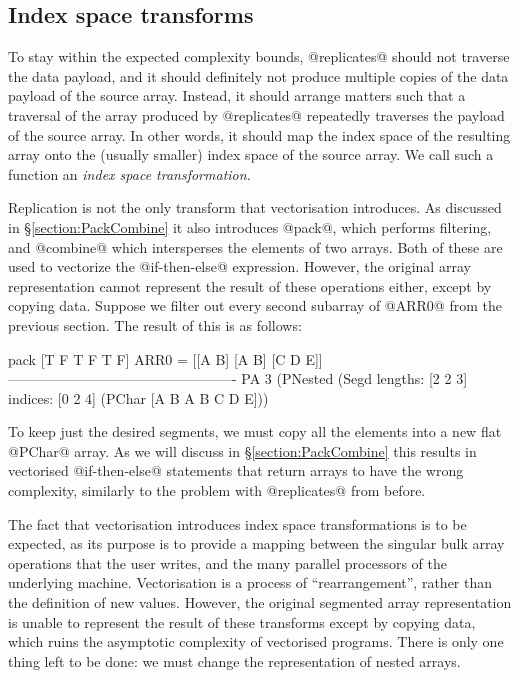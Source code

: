 \subsection{Index space transforms}

To stay within the expected complexity bounds, @replicates@ should not traverse the data payload, and it should definitely not produce multiple copies of the data payload of the source array. Instead, it should arrange matters such that a traversal of the array produced by @replicates@ repeatedly traverses the payload of the source array.  In other words, it should map the index space of the resulting array onto the (usually smaller) index space of the source array.  We call such a function an \emph{index space transformation.}

Replication is not the only transform that vectorisation introduces. As discussed in \S\ref{section:PackCombine} it also introduces @pack@, which performs filtering, and @combine@ which intersperses the elements of two arrays. Both of these are used to vectorize the @if-then-else@ expression. However, the original array representation cannot represent the result of these operations either, except by copying data. Suppose we filter out every second subarray of @ARR0@ from the previous section.  The result of this is as follows:
\begin{small}
\begin{code}
   pack [T F T F T F] ARR0 = [[A B] [A B] [C D E]]
  -------------------------------------------------
   PA 3 (PNested
    (Segd  lengths: [2 2 3] indices: [0 2 4]
    (PChar [A B A B C D E]))
\end{code}
\end{small}

To keep just the desired segments, we must copy all the elements into a new flat @PChar@ array. As we will discuss in \S\ref{section:PackCombine} this results in vectorised @if-then-else@ statements that return arrays to have the wrong complexity, similarly to the problem with @replicates@ from before.  

The fact that vectorisation introduces index space transformations is to be expected, as its purpose is to provide a mapping between the singular bulk array operations that the user writes, and the many parallel processors of the underlying machine. Vectorisation is a process of ``rearrangement'', rather than the definition of new values. However, the original segmented array representation is unable to represent the result of these transforms except by copying data, which ruins the asymptotic complexity of vectorised programs. There is only one thing left to be done: we must change the representation of nested arrays.


